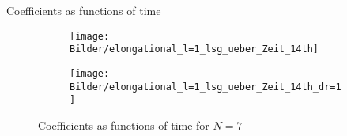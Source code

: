 \begin{comment}
\begin{frame}{Coefficients as functions of time}
	\begin{figure}
		\begin{subfigure}{0.48\textwidth}
			\texttt{[image: Bilder/elongational\_l=1\_lsg\_ueber\_Zeit\_6th]}
		\end{subfigure}
		\hfill
		\begin{subfigure}{0.48\textwidth}
			\texttt{[image: Bilder/elongational\_l=1\_lsg\_ueber\_Zeit\_6th\_dr=1]}
		\end{subfigure}
		\caption{Coefficients as functions of time for $6th$ order}
	\end{figure}
\end{frame}
\end{comment}

\begin{frame}{Coefficients as functions of time}
	\begin{figure}
		\begin{subfigure}{0.48\textwidth}
			\texttt{[image: Bilder/elongational\_l=1\_lsg\_ueber\_Zeit\_14th]}
		\end{subfigure}
		\hfill
		\begin{subfigure}{0.48\textwidth}
			\texttt{[image: Bilder/elongational\_l=1\_lsg\_ueber\_Zeit\_14th\_dr=1]}
		\end{subfigure}
		\caption{Coefficients as functions of time for $N=7$}
	\end{figure}
\end{frame}






